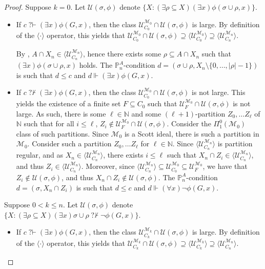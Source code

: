 \documentclass{article}
\def\NN{\mathbb{N}}
\def\PP{\mathbb{P}}
\def\U{\mathcal{U}}
\def\M{\mathcal{M}}
\def\PP{\mathbb{P}}
\newcommand{\ludovic}[1]{\textcolor{blue}{#1}}
\newcommand{\qvdash}{\operatorname{{?}{\vdash}}}
\newcommand{\nqvdash}{\operatorname{{?}{\nvdash}}}
\numberwithin{theorem}{section}
\theoremstyle{definition}
\begin{document}
\begin{proof}
Suppose $k=0$.
Let $\U(\sigma,\phi)$ denote $\{X : (\exists \rho \subseteq X )(\exists x)\phi(\sigma \cup \rho, x) \}$. %
\begin{itemize}
    \item If $c \qvdash (\exists x) \phi(G,x)$, then the class $\U_{C_{0}}^{\M_{0}} \cap \U(\sigma,\phi)$ is large. By definition of the $\langle \cdot \rangle$ operator, this yields that  $\U_{C_{0}}^{\M_{0}} \cap \U(\sigma,\phi) \supseteq \langle \U_{C_{0}}^{\M_{0}} \rangle \supseteq \langle \U_{C_n}^{\M_n} \rangle$.

    
    By , $A \cap X_n \in \langle \U_{C_n}^{\M_n}\rangle$, hence there exists some $\rho \subseteq A \cap X_n$ such that $(\exists x)\phi(\sigma \cup \rho, x)$ holds. The $\PP^A_n$-condition $d = (\sigma \cup \rho, X_n \setminus \{0, \dots, |\rho|-1\})$ is such that $d \leq c$ and $d \Vdash (\exists x)\phi(G,x)$.

    \item 
    If $c \nqvdash (\exists x) \phi(G,x)$, then the class $\U_{C_{0}}^{\M_{0}} \cap \U(\sigma,\phi)$ is not large. 
 This yields the existence of a finite set $F \subseteq C_0$ such that $\U_F^{\M_0} \cap \U(\sigma,\phi)$ is not large. As such, there is some $\ell \in \NN$ and some $(\ell+1)$-partition $Z_0, \dots Z_\ell$ of $\NN$ such that for all $i \leq \ell$, $Z_i \not \in \U_F^{\M_0} \cap \U(\sigma,\phi)$. Consider the $\Pi_1^0(\M_0)$ class of such partitions. Since $\M_0$ is a Scott ideal, there is such a partition in $\M_0$. Consider such a partition $Z_0, \dots Z_\ell$ for $\ell \in \NN$. Since $\langle \U_{C_n}^{\M_n} \rangle$ is partition regular, and as $X_n \in \langle \U_{C_n}^{\M_n} \rangle$, there exists $i \leq \ell$ such that $X_n \cap Z_i \in  \langle \U_{C_n}^{\M_n} \rangle $, and thus $Z_i \in \langle \U_{C_n}^{\M_n} \rangle $.  Moreover, since $\langle \U_{C_n}^{\M_n} \rangle \subseteq \U_{C_0}^{\M_0} \subseteq \U_F^{\M_0}$, we have that $Z_i \not \in \U(\sigma,\phi)$, and thus $X_n \cap Z_i \not \in \U(\sigma,\phi)$.  The $\PP^A_n$-condition $d = (\sigma, X_n \cap Z_i)$ is such that $d \leq c$ and $d \Vdash (\forall x) \neg \phi(G,x)$.
\end{itemize}
Suppose $0 < k \leq n$.
Let $\U(\sigma,\phi)$ denote $\{X : (\exists \rho \subseteq X )(\exists x)\sigma \cup \rho \nqvdash \neg \phi(G,x)  \}$. %
\begin{itemize}
     \item If $c \qvdash (\exists x) \phi(G,x)$, then the class $\U_{C_{k}}^{\M_{k}} \cap \U(\sigma,\phi)$ is large. By definition of the $\langle \cdot \rangle$ operator, this yields that  $\U_{C_{k}}^{\M_{k}} \cap \U(\sigma,\phi) \supseteq \langle \U_{C_{k}}^{\M_{k}} \rangle \supseteq \langle \U_{C_n}^{\M_n} \rangle $.


\end{itemize}
\end{proof}
\end{document}
